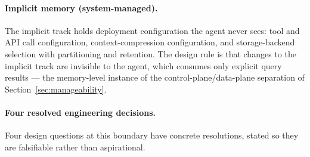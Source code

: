 \paragraph{Implicit memory (system-managed).}
The implicit track holds deployment configuration the agent never sees: tool and API call configuration, context-compression configuration, and storage-backend selection with partitioning and retention. The design rule is that changes to the implicit track are invisible to the agent, which consumes only explicit query results --- the memory-level instance of the control-plane/data-plane separation of Section~\ref{sec:manageability}.

\paragraph{Four resolved engineering decisions.}
Four design questions at this boundary have concrete resolutions, stated so they are falsifiable rather than aspirational.
